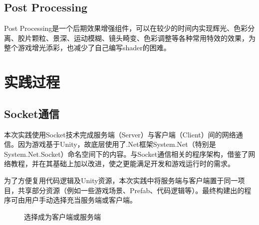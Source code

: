 \documentclass[conference]{IEEEtran}
\begin{document}
\subsection{Post Processing}
Post Processing是一个后期效果增强组件，可以在较少的时间内实现辉光、色彩分离、胶片颗粒、景深、运动模糊、镜头畸变、色彩调整等各种常用特效的效果，为整个游戏增光添彩，也减少了自己编写shader的困难。


\section{实践过程}

\subsection{Socket通信}
本次实践使用Socket技术完成服务端（Server）与客户端（Client）间的网络通信。因为游戏基于Unity，故底层使用了.Net框架System.Net（特别是System.Net.Socket）命名空间下的内容。与Socket通信相关的程序架构，借鉴了网络教程\cite{myCite:Tom}，并在其基础上加以改进，使之更能满足开发和游戏运行时的需求。

为了方便复用代码逻辑及Unity资源，本次实践中将服务端与客户端置于同一项目，共享部分资源（例如一些游戏场景、Prefab、代码逻辑等）。最终构建出的程序可由用户手动选择充当服务端或客户端。

\begin{figure}[h!]  
	\setlength{\abovecaptionskip}{.2cm}   %
	\setlength{\belowcaptionskip}{0cm}   %
    \centering  %
    \caption{选择成为客户端或服务端}
    \label{fig:beCS}
\end{figure}
\end{document}
